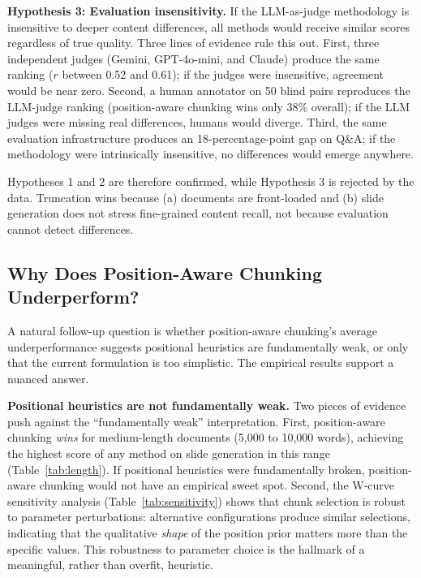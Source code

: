 \documentclass{ieeeaccess}
\begin{document}
\textbf{Hypothesis 3: Evaluation insensitivity.} If the LLM-as-judge methodology is insensitive to deeper content differences, all methods would receive similar scores regardless of true quality. Three lines of evidence rule this out. First, three independent judges (Gemini, GPT-4o-mini, and Claude) produce the same ranking ($r$ between 0.52 and 0.61); if the judges were insensitive, agreement would be near zero. Second, a human annotator on 50 blind pairs reproduces the LLM-judge ranking (position-aware chunking wins only 38\% overall); if the LLM judges were missing real differences, humans would diverge. Third, the same evaluation infrastructure produces an 18-percentage-point gap on Q\&A; if the methodology were intrinsically insensitive, no differences would emerge anywhere.

Hypotheses 1 and 2 are therefore confirmed, while Hypothesis 3 is rejected by the data. Truncation wins because (a) documents are front-loaded and (b) slide generation does not stress fine-grained content recall, not because evaluation cannot detect differences.

\subsection{Why Does Position-Aware Chunking Underperform?}
\label{sec:why-pac}

A natural follow-up question is whether position-aware chunking's average underperformance suggests positional heuristics are fundamentally weak, or only that the current formulation is too simplistic. The empirical results support a nuanced answer.

\textbf{Positional heuristics are not fundamentally weak.} Two pieces of evidence push against the ``fundamentally weak'' interpretation. First, position-aware chunking \emph{wins} for medium-length documents (5,000 to 10,000 words), achieving the highest score of any method on slide generation in this range (Table~\ref{tab:length}). If positional heuristics were fundamentally broken, position-aware chunking would not have an empirical sweet spot. Second, the W-curve sensitivity analysis (Table~\ref{tab:sensitivity}) shows that chunk selection is robust to parameter perturbations: alternative configurations produce similar selections, indicating that the qualitative \emph{shape} of the position prior matters more than the specific values. This robustness to parameter choice is the hallmark of a meaningful, rather than overfit, heuristic.
\end{document}
